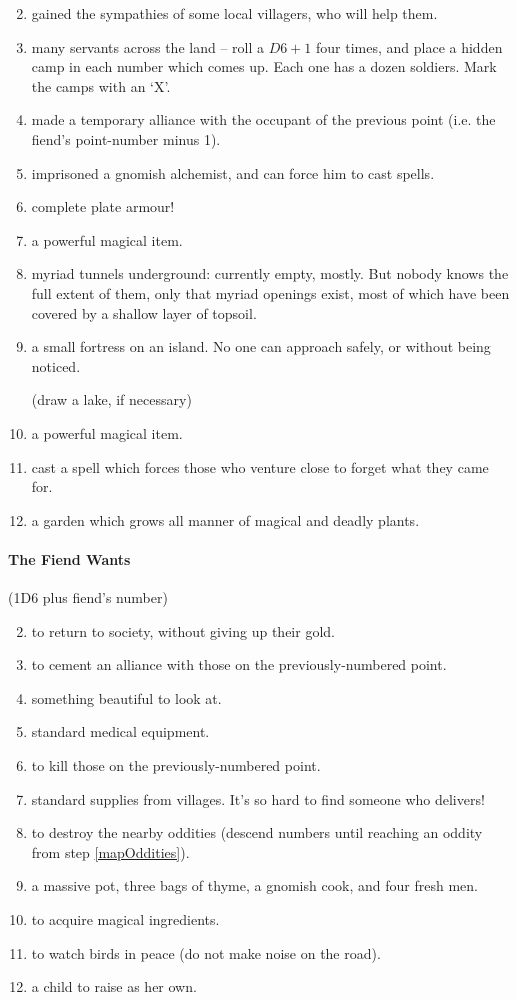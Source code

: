 \begin{multicols}{2}
\begin{enumerate}
\setcounter{enumi}{1}
\item
  gained the sympathies of some local villagers, who will help them.
\item
  many servants across the land -- roll a $D6 + 1$ four times, and place a hidden camp in each number which comes up.
  Each one has a dozen soldiers.
  Mark the camps with an `X'.
\item
  made a temporary alliance with the occupant of the previous point (i.e. the fiend's point-number minus 1).
\item
  imprisoned a gnomish alchemist, and can force him to cast spells.
\item
  complete plate armour!
\item
  a powerful magical item.
\item
  myriad tunnels underground: currently empty, mostly. But nobody knows
  the full extent of them, only that myriad openings exist, most of
  which have been covered by a shallow layer of topsoil.
\item
  a small fortress on an island. No one can approach safely, or without
  being noticed.

  (draw a lake, if necessary)
\item
  a powerful magical item.
\item
  cast a spell which forces those who venture close to forget what they
  came for.
\item
  a garden which grows all manner of magical and deadly plants.
\end{enumerate}

\paragraph{The Fiend Wants}
\label{fiendDesires}

(1D6 plus fiend's number)

\begin{enumerate}
\setcounter{enumi}{1}
\item
  to return to society, without giving up their gold.
\item
  to cement an alliance with those on the previously-numbered point.
\item
  something beautiful to look at.
\item
  standard medical equipment.
\item
  to kill those on the previously-numbered point.
\item
  standard supplies from \glspl{village}.
  It's so hard to find someone who delivers!
\item
  to destroy the nearby oddities (descend numbers until reaching an oddity from step \ref{mapOddities}).
\item
  a massive pot, three bags of thyme, a gnomish cook, and four fresh men.
\item
  to acquire magical ingredients.
\item
  to watch birds in peace (do not make noise on the road).
\item
  a child to raise as her own.
\end{enumerate}


\end{multicols}

